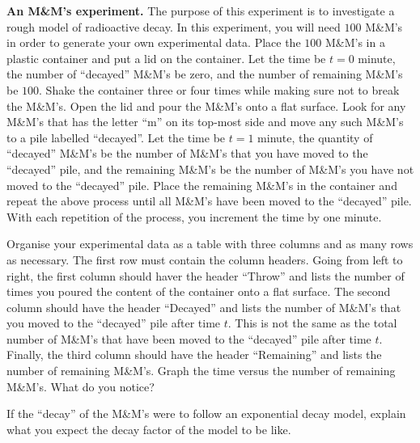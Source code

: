 \documentclass[a4paper,oneside,12pt]{article}
\begin{document}
\begin{exercise}
\label{ex:exponential:MnM_experiment}
\textbf{An M\&M's experiment.}
The purpose of this experiment is to investigate a rough model of
radioactive decay.  In this experiment, you will need $100$ M\&M's in
order to generate your own experimental data.  Place the $100$ M\&M's
in a plastic container and put a lid on the container.  Let the time
be $t = 0$ minute, the number of ``decayed'' M\&M's be zero, and the
number of remaining M\&M's be $100$.  Shake the container three or
four times while making sure not to break the M\&M's.  Open the lid
and pour the M\&M's onto a flat surface.  Look for any M\&M's that has
the letter ``m'' on its top-most side and move any such M\&M's to a
pile labelled ``decayed''.  Let the time be $t = 1$ minute, the
quantity of ``decayed'' M\&M's be the number of M\&M's that you have
moved to the ``decayed'' pile, and the remaining M\&M's be the number
of M\&M's you have not moved to the ``decayed'' pile.  Place the
remaining M\&M's in the container and repeat the above process until
all M\&M's have been moved to the ``decayed'' pile.  With each
repetition of the process, you increment the time by one minute.
\begin{packedenum}
\item\label{subex:exponential:MnM_data}
  Organise your experimental data as a table with three columns and as
  many rows as necessary.  The first row must contain the column
  headers.  Going from left to right, the first column should haver
  the header ``Throw'' and lists the number of times you poured the
  content of the container onto a flat surface.  The second column
  should have the header ``Decayed'' and lists the number of M\&M's
  that you moved to the ``decayed'' pile after time $t$.  This is not
  the same as the total number of M\&M's that have been moved to the
  ``decayed'' pile after time $t$.  Finally, the third column should
  have the header ``Remaining'' and lists the number of remaining
  M\&M's.  Graph the time versus the number of remaining M\&M's.  What
  do you notice?

\item\label{subex:exponential:MnM_decay_factor}
  If the ``decay'' of the M\&M's were to follow an exponential decay
  model, explain what you expect the decay factor of the model to be
  like.


\end{packedenum}
\end{exercise}
\end{document}
